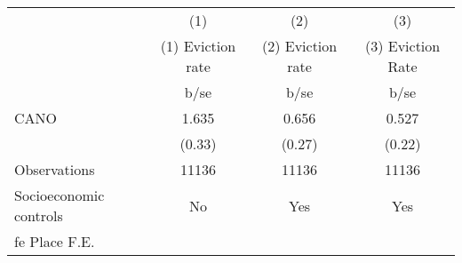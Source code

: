 {
\def\sym#1{\ifmmode^{#1}\else\(^{#1}\)\fi}
\begin{tabular}{l*{3}{c}}
\hline\hline
                    &\multicolumn{1}{c}{(1)}&\multicolumn{1}{c}{(2)}&\multicolumn{1}{c}{(3)}\\
                    &(1) Eviction rate&(2) Eviction rate&(3) Eviction Rate\\
                    &        b/se&        b/se&        b/se\\
\hline
CANO                &       1.635&       0.656&       0.527\\
                    &      (0.33)&      (0.27)&      (0.22)\\
\hline
Observations        &       11136&       11136&       11136\\
Socioeconomic controls&          No&         Yes&         Yes\\
fe Place F.E.       &            &            &            \\
\hline\hline
\end{tabular}
}

